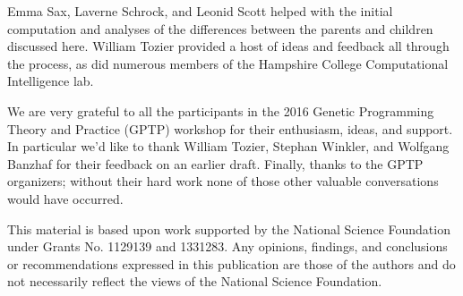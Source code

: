 \documentclass[graybox]{svmult}
\begin{document}
\begin{acknowledgement}
	Emma Sax, Laverne Schrock, and Leonid Scott helped 
	with the initial computation and analyses of the differences between the 
	parents and children discussed here. William Tozier provided a host of 
	ideas and feedback all through the process, as did numerous members
	of the Hampshire College Computational Intelligence lab.
	
	We are very grateful to all the participants in the 2016 Genetic Programming Theory and Practice (GPTP) workshop for their enthusiasm, ideas, and support. In particular we'd like to thank William Tozier,
	Stephan Winkler, and Wolfgang Banzhaf for their feedback on an earlier
	draft. Finally, thanks to the GPTP organizers; without their hard work none of those other valuable conversations would have occurred.
	
	This material is based upon work supported by the National Science Foundation under Grants No. 1129139 and 1331283. Any opinions, findings, and conclusions or recommendations expressed in this publication are those of the authors and do not necessarily reflect the views of the National Science Foundation.
\end{acknowledgement}



\end{document}
